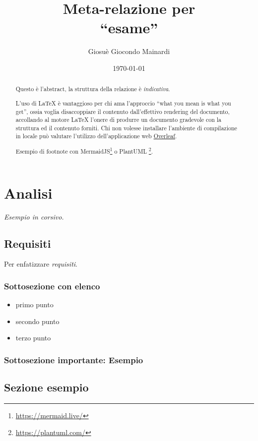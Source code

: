 \documentclass[a4paper,12pt]{report}
\title{Meta-relazione per\\``esame''}
\author{Giosuè Giocondo Mainardi}
\date{\today}
\begin{document}
\maketitle

\begin{abstract}
Questo è l'abstract, la struttura della relazione è \textit{indicativa}.

L'uso di \LaTeX{} è vantaggioso per chi ama l'approccio ``what you mean is what you get'', ossia voglia disaccoppiare il contenuto dall'effettivo rendering del documento, accollando al motore \LaTeX{} l'onere di produrre un documento gradevole con la struttura ed il contenuto forniti.
%
Chi non volesse installare l'ambiente di compilazione in locale può valutare l'utilizzo dell'applicazione web \href{https://www.overleaf.com/}{Overleaf}.
%

Esempio di footnote con MermaidJS\footnote{\url{https://mermaid.live/}} o PlantUML \footnote{\url{https://plantuml.com/}}.
\end{abstract}

\tableofcontents

\chapter{Analisi}

\textit{Esempio in corsivo.}
\section{Requisiti}

Per enfatizzare \emph{requisiti}.

\subsection*{Sottosezione con elenco}
\begin{itemize}
	\item primo punto
	\item secondo punto
	\item terzo punto
\end{itemize}

\subsection*{Sottosezione importante: Esempio}

\section{Sezione esempio}
\end{document}
